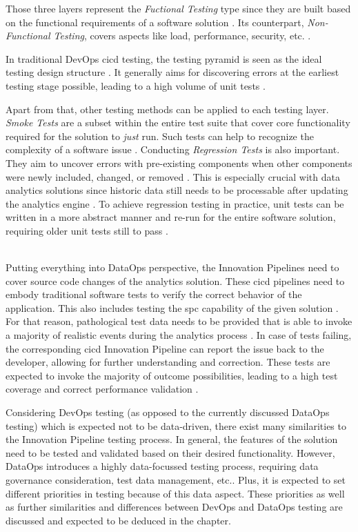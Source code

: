 Those three layers represent the \textit{Fuctional Testing} type since they are built based on the functional requirements of a software solution \cite[69]{Mahfuz2016}. Its counterpart, \textit{Non-Functional Testing}, covers aspects like load, performance, security, etc. \cite[70]{Mahfuz2016}.

In traditional DevOps \ac{cicd} testing, the testing pyramid is seen as the ideal testing design structure \cite{devops-google}. It generally aims for discovering errors at the earliest testing stage possible, leading to a high volume of unit tests \cite{Vocke2018}.

Apart from that, other testing methods can be applied to each testing layer. \textit{Smoke Tests} are a subset within the entire test suite that cover core functionality required for the solution to \textit{just} run. Such tests can help to recognize the complexity of a software issue \cite[sec. 5]{Tarlinder2016}. Conducting \textit{Regression Tests} is also important. They aim to uncover errors with pre-existing components when other components were newly included, changed, or removed \cite[70]{Mahfuz2016}\cite{Mathur2013}. This is especially crucial with data analytics solutions since historic data still needs to be processable after updating the analytics engine \cite{Shen2019}. To achieve regression testing in practice, unit tests can be written in a more abstract manner and re-run for the entire software solution, requiring older unit tests still to pass \cite{Mathur2013}.
\\\

Putting everything into DataOps perspective, the Innovation Pipelines need to cover source code changes of the analytics solution. These \ac{cicd} pipelines need to embody traditional software tests to verify the correct behavior of the application. This also includes testing the \ac{spc} capability of the given solution \cite{DataKitchen2020}. For that reason, pathological test data needs to be provided that is able to invoke a majority of realistic events during the analytics process \cite[42]{Bergh2019}. In case of tests failing, the corresponding \ac{cicd} Innovation Pipeline can report the issue back to the developer, allowing for further understanding and correction. These tests are expected to invoke the majority of outcome possibilities, leading to a high test coverage and correct performance validation \cite{DataKitchen2020a}.

Considering DevOps testing (as opposed to the currently discussed DataOps testing) which is expected not to be data-driven, there exist many similarities to the Innovation Pipeline testing process. In general, the features of the solution need to be tested and validated based on their desired functionality. However, DataOps introduces a highly data-focussed testing process, requiring data governance consideration, test data management, etc.. Plus, it is expected to set different priorities in testing because of this data aspect. These priorities as well as further similarities and differences between DevOps and DataOps testing are discussed and expected to be deduced in the  chapter.


